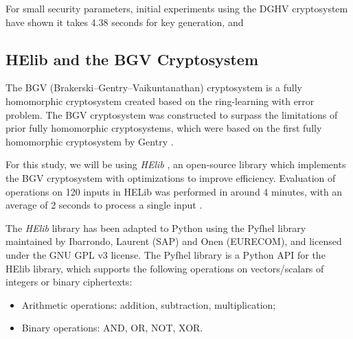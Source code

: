 For small security parameters, initial experiments using the DGHV cryptosystem have shown it takes 4.38 seconds for key generation, and 

\subsection{HElib and the BGV Cryptosystem}
The BGV (Brakerski--Gentry--Vaikuntanathan) cryptosystem \cite{cryptoeprint:2011:277} is a fully homomorphic cryptosystem created based on the ring-learning with error problem. The BGV cryptosystem was constructed to surpass the limitations of prior fully homomorphic cryptosystems, which were based on the first fully homomorphic cryptosystem by Gentry \cite{gentry_fully_2009}.

For this study, we will be using \textit{HElib} \cite{garay_algorithms_2014}, an open-source library which implements the BGV cryptosystem with optimizations to improve efficiency. Evaluation of operations on 120 inputs in HELib was performed in around 4 minutes, with an average of 2 seconds to process a single input \cite{hutchison_fully_2010,cryptoeprint:2011:566}.

The \textit{HElib} library has been adapted to Python using the Pyfhel library \cite{pyfhel_2018} maintained by Ibarrondo, Laurent (SAP) and Onen (EURECOM), and licensed under the GNU GPL v3 license. The Pyfhel library is a Python API for the HElib library, which supports the following operations on vectors/scalars of integers or binary ciphertexts:
\begin{itemize}
	\item Arithmetic operations: addition, subtraction, multiplication;
	\item Binary operations: AND, OR, NOT, XOR.
\end{itemize}
